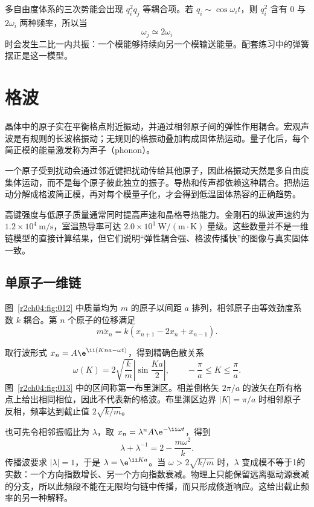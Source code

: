 多自由度体系的三次势能会出现 $q_i^2q_j$ 等耦合项。若 $q_i\sim\cos\omega_i t$，则 $q_i^2$ 含有 $0$ 与 $2\omega_i$ 两种频率，所以当
\begin{equation}
 \omega_j\simeq2\omega_i
 \label{r2ch04:eq:031}
\end{equation}
时会发生二比一内共振：一个模能够持续向另一个模输送能量。配套练习中的弹簧摆正是这一模型。

\section{格波}
\label{r2ch04:sec:lattice}

晶体中的原子实在平衡格点附近振动，并通过相邻原子间的弹性作用耦合。宏观声波是有规则的长波格振动；无规则的格振动叠加构成固体热运动。量子化后，每个简正模的能量激发称为声子（phonon）。

一个原子受到扰动会通过邻近键把扰动传给其他原子，因此格振动天然是多自由度集体运动，而不是每个原子彼此独立的振子。导热和传声都依赖这种耦合。把热运动分解成格波简正模，再对每个模量子化，才会得到低温固体热容的正确趋势。

高键强度与低原子质量通常同时提高声速和晶格导热能力。金刚石的纵波声速约为
$1.2\times10^4\ \mathrm{m/s}$，室温热导率可达
$2.0\times10^3\ \mathrm{W/(m\cdot K)}$ 量级。这些数量并不是一维链模型的直接计算结果，但它们说明“弹性耦合强、格波传播快”的图像与真实固体一致。

\subsection{单原子一维链}

图~\ref{r2ch04:fig:012} 中质量均为 $m$ 的原子以间距 $a$ 排列，相邻原子由等效劲度系数 $k$ 耦合。第 $n$ 个原子的位移满足
\begin{equation}
 m\ddot x_n=k(x_{n+1}-2x_n+x_{n-1}).
 \label{r2ch04:eq:032}
\end{equation}
\figMonoatomicChain

取行波形式 $x_n=A\e^{\ii(Kna-\omega t)}$，得到精确色散关系
\begin{equation}
 \omega(K)=2\sqrt{\frac km}\left|\sin\frac{Ka}{2}\right|,\qquad
 -\frac\pi a\le K\le\frac\pi a.
 \label{r2ch04:eq:033}
\end{equation}
图~\ref{r2ch04:fig:013} 中的区间称第一布里渊区。相差倒格矢 $2\pi/a$ 的波矢在所有格点上给出相同相位，因此不代表新的格波。布里渊区边界 $|K|=\pi/a$ 时相邻原子反相，频率达到截止值 $2\sqrt{k/m}$。
\figMonoDispersion

也可先令相邻振幅比为 $\lambda$，取 $x_n=\lambda^nA\e^{-\ii\omega t}$，得到
\[
 \lambda+\lambda^{-1}=2-\frac{m\omega^2}{k}.
\]
传播波要求 $|\lambda|=1$，于是 $\lambda=\e^{\ii Ka}$。当 $\omega>2\sqrt{k/m}$ 时，$\lambda$ 变成模不等于1的实数：一个方向指数增长、另一个方向指数衰减。物理上只能保留远离驱动源衰减的分支，所以此频段不能在无限均匀链中传播，而只形成倏逝响应。这给出截止频率的另一种解释。

